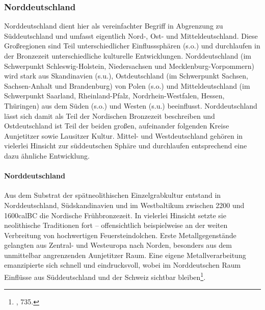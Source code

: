 \documentclass[openany,twoside,twocolumn]{book}
\let\rmarkdownfootnote\footnote%
\def\footnote{\protect\rmarkdownfootnote}
\begin{document}
\autocites{falkenstein_development_2012}{falkenstein_zum_2017}

\hypertarget{norddeutschland}{%
\subsubsection{Norddeutschland}\label{norddeutschland}}

Norddeutschland dient hier als vereinfachter Begriff in Abgrenzung zu
Süddeutschland und umfasst eigentlich Nord-, Ost- und Mitteldeutschland.
Diese Großregionen sind Teil unterschiedlicher Einflusssphären (s.o.)
und durchlaufen in der Bronzezeit unterschiedliche kulturelle
Entwicklungen. Norddeutschland (im Schwerpunkt Schleswig-Holstein,
Niedersachsen und Mecklenburg-Vorpommern) wird stark aus Skandinavien
(s.u.), Ostdeutschland (im Schwerpunkt Sachsen, Sachsen-Anhalt und
Brandenburg) von Polen (s.o.) und Mitteldeutschland (im Schwerpunkt
Saarland, Rheinland-Pfalz, Nordrhein-Westfalen, Hessen, Thüringen) aus
dem Süden (s.o.) und Westen (s.u.) beeinflusst. Norddeutschland lässt
sich damit als Teil der Nordischen Bronzezeit beschreiben und
Ostdeutschland ist Teil der beiden großen, aufeinander folgenden Kreise
Aunjetitzer sowie Lausitzer Kultur. Mittel- und Westdeutschland gehören
in vielerlei Hinsicht zur süddeutschen Sphäre und durchlaufen
entsprechend eine dazu ähnliche Entwicklung.

\hypertarget{norddeutschland-1}{%
\paragraph{Norddeutschland}\label{norddeutschland-1}}

Aus dem Substrat der spätneolithischen Einzelgrabkultur entstand in
Norddeutschland, Südskandinavien und im Westbaltikum zwischen 2200 und
1600calBC die Nordische Frühbronzezeit. In vielerlei Hinsicht setzte sie
neolithische Traditionen fort -- offensichtlich beispielweise an der
weiten Verbreitung von hochwertigen Feuersteindolchen. Erste
Metallgegenstände gelangten aus Zentral- und Westeuropa nach Norden,
besonders aus dem unmittelbar angrenzenden Aunjetitzer Raum. Eine eigene
Metallverarbeitung emanzipierte sich schnell und eindrucksvoll, wobei im
Norddeutschen Raum Einflüsse aus Süddeutschland und der Schweiz sichtbar
bleiben\footnote{\textcite{jockenhovel_germany_2013}, 735.}.
\end{document}
